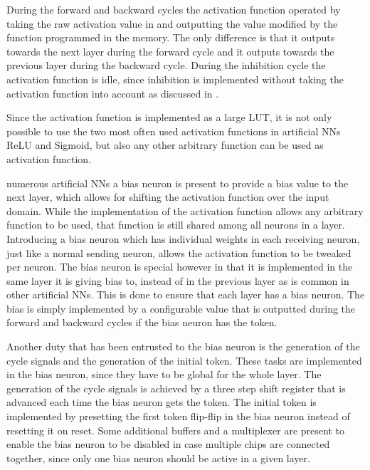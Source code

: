 During the forward and backward cycles the activation function operated by taking the raw activation value in and outputting the value modified by the function programmed in the memory. The only difference is that it outputs towards the next layer during the forward cycle and it outputs towards the previous layer during the backward cycle. During the inhibition cycle the activation function is idle, since inhibition is implemented without taking the activation function into account as discussed in .

Since the activation function is implemented as a large \ac{LUT}, it is not only possible to use the two most often used activation functions in artificial \acp{NN} \ac{ReLU} and Sigmoid\cite{8192463}, but also any other arbitrary function can be used as activation function.

 numerous artificial \acp{NN} a bias neuron is present to provide a bias value to the next layer, which allows for shifting the activation function over the input domain. While the implementation of the activation function allows any arbitrary function to be used, that function is still shared among all neurons in a layer. Introducing a bias neuron which has individual weights in each receiving neuron, just like a normal sending neuron, allows the activation function to be tweaked per neuron. The bias neuron is special however in that it is implemented in the same layer it is giving bias to, instead of in the previous layer as is common in other artificial \acp{NN}. This is done to ensure that each layer has a bias neuron. The bias is simply implemented by a configurable value that is outputted during the forward and backward cycles if the bias neuron has the token.

Another duty that has been entrusted to the bias neuron is the generation of the cycle signals and the generation of the initial token. These tasks are implemented in the bias neuron, since they have to be global for the whole layer. The generation of the cycle signals is achieved by a three step shift register that is advanced each time the bias neuron gets the token. The initial token is implemented by presetting the first token flip-flip in the bias neuron instead of resetting it on reset. Some additional buffers and a multiplexer are present to enable the bias neuron to be disabled in case multiple chips are connected together, since only one bias neuron should be active in a given layer.
